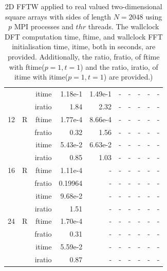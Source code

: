 \documentclass[a4paper]{article}
\begin{document}
\begin{table}[htbp]
\begin{center}
\begin{small}
\begin{tabular}{|r|r|r|r|r|r|r|r|r|r|}
             &             &  itime &    1.18e-1 &    1.49e-1 &      - &      - &      - &      - &      - \\
             &             &  iratio &    1.84  &    2.32  &      - &      - &      - &      - &      - \\\hline
   12 &   R &   ftime &    1.77e-4 &    8.66e-4 &      - &      - &      - &      - &      - \\
             &             &  fratio &   0.32 &    1.56  &      - &      - &      - &      - &      - \\
             &             &  itime &    5.43e-2 &    6.63e-2 &      - &      - &      - &      - &      - \\
             &             &  iratio &    0.85 &    1.03  &      - &      - &      - &      - &      - \\\hline
   16 &   R &   ftime &    1.11e-4 &      - &      - &      - &      - &      - &      - \\
             &             &  fratio &    0.19964 &      - &      - &      - &      - &      - &      - \\
             &             &  itime &    9.68e-2 &      - &      - &      - &      - &      - &      - \\
             &             &  iratio &    1.51  &      - &      - &      - &      - &      - &      - \\\hline
   24 &   R &   ftime &    1.70e-4 &      - &      - &      - &      - &      - &      - \\
             &             &  fratio &   0.31 &      - &      - &      - &      - &      - &      - \\
             &             &  itime &    5.59e-2 &      - &      - &      - &      - &      - &      - \\
             &             &  iratio &    0.87 &      - &      - &      - &      - &      - &      - \\\hline
\end{tabular}
\caption{2D FFTW applied to real valued two-dimensional square arrays with sides of length $N=2048$ using $p$ MPI processes and $thr$ threads. The wallclock DFT computation time, ftime, and wallclock FFT initialisation time, itime, both in seconds, are provided. Additionally, the ratio, fratio, of ftime  with ftime($p=1,t=1$) and the ratio, iratio, of itime  with itime($p=1,t=1$) are provided.) }\label{Tbl:FFTW2d2048}
\end{small}
\end{center}
\end{table}
\end{document}
